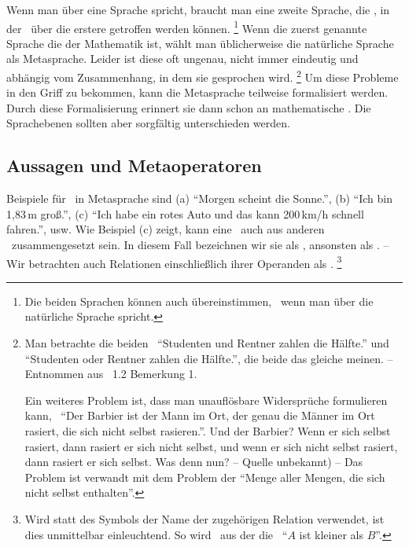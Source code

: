 Wenn man über eine Sprache spricht, braucht man eine zweite Sprache, die , in der \Aussagen\ über die erstere getroffen werden können.%
\footnote{%
	Die beiden Sprachen können auch übereinstimmen, \textzB\ wenn man über die natürliche Sprache spricht.
}
Wenn die zuerst genannte Sprache die der Mathematik ist, wählt man üblicherweise die natürliche Sprache als Metasprache.
Leider ist diese oft ungenau, nicht immer eindeutig und abhängig vom Zusammenhang, in dem sie gesprochen wird.%
\footnote{%
	Man betrachte die beiden \Aussagen\ \enquote{Studenten und Rentner zahlen die Hälfte.} und \enquote{Studenten oder Rentner zahlen die Hälfte.}, die beide das gleiche meinen.
	-- Entnommen aus \cite{bib:Rautenberg} \sectionname~1.2 Bemerkung 1.

	Ein weiteres Problem ist, dass man unauflösbare Widersprüche formulieren kann, \textzB\ \enquote{Der Barbier ist der Mann im Ort, der genau die Männer im Ort rasiert, die sich nicht selbst rasieren.}.
	Und der Barbier?
	Wenn er sich selbst rasiert, dann rasiert er sich nicht selbst, und wenn er sich nicht selbst rasiert, dann rasiert er sich selbst.
	Was denn nun?
	-- Quelle unbekannt) --
	Das Problem ist verwandt mit dem Problem der \enquote{Menge aller Mengen, die sich nicht selbst enthalten}.
}
Um diese Probleme in den Griff zu bekommen, kann die Metasprache teilweise formalisiert werden.
Durch diese Formalisierung erinnert sie dann schon an mathematische .
Die Sprachebenen sollten aber sorgfältig unterschieden werden.

\subsection{Aussagen und Metaoperatoren}%
\label{sub:AussagenUndMetaoperatoren}

Beispiele für \Aussagen\ in Metasprache sind
(a) \enquote{Morgen scheint die Sonne.},
(b) \enquote{Ich bin 1,83\,m groß.},
(c) \enquote{Ich habe ein rotes Auto und das kann 200\,km/h schnell fahren.}, usw.
Wie Beispiel (c) zeigt, kann eine \Aussage\ auch aus anderen \Aussagen\ zusammengesetzt sein.
In diesem Fall bezeichnen wir sie als , ansonsten als .
-- Wir betrachten auch Relationen einschließlich ihrer Operanden als \Aussagen.%
\footnote{%
	Wird statt des Symbols der Name der zugehörigen Relation verwendet, ist dies unmittelbar einleuchtend.
	So wird \textzB\ aus der   die \Aussage\ \enquote{$A$ ist kleiner als $B$}.
}

